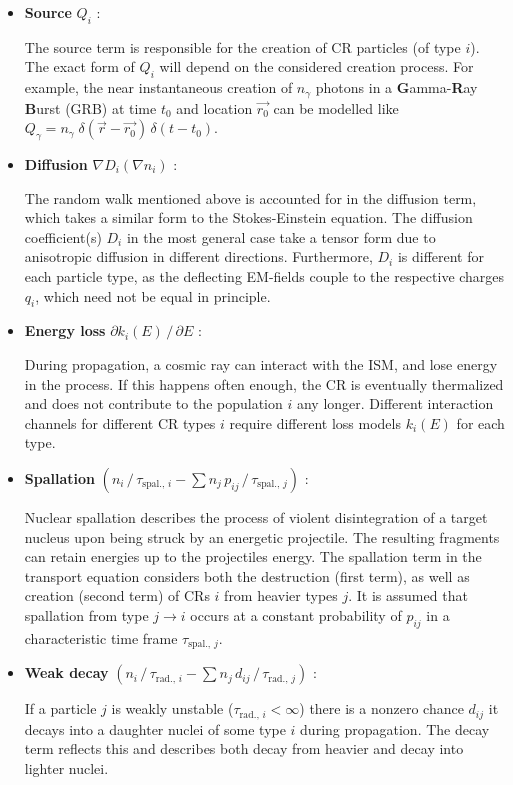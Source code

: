 \begin{itemize}
	\item \textbf{Source} $Q_i$ :

	The source term is responsible for the creation of CR particles (of type $i$). The exact form of $Q_i$ will depend on the considered creation process. For 
	example, the near instantaneous creation of $n_\gamma$ photons in a \textbf{G}amma-\textbf{R}ay \textbf{B}urst (GRB) at time $t_0$ and location $\vec{r_0}$ can 
	be modelled like $Q_\gamma = n_\gamma \; \delta(\vec{r} - \vec{r_0}) \, \delta(t - t_0)$.

	\item \textbf{Diffusion} $\nabla D_i \left( \nabla n_i \right)$ :

	The random walk mentioned above is accounted for in the diffusion term, which takes a similar form to the Stokes-Einstein equation. The diffusion 
	coefficient(s) $D_i$ in the most general case take a tensor form due to anisotropic diffusion in different directions. Furthermore, $D_i$ is 
	different for each particle type, as the deflecting EM-fields couple to the respective charges $q_i$, which need not be equal in principle.

	\item \textbf{Energy loss} $\partial k_i(E)\,/\,\partial E$ :

	During propagation, a cosmic ray can interact with the ISM, and lose energy in the process. If this happens often enough, the CR is eventually thermalized and 
	does not contribute to the population $i$ any longer. Different interaction channels for different CR types $i$ require different loss models $k_i(E)$ for each 
	type. 

	\item \textbf{Spallation} $\left( n_i\,/\,\tau_{\text{spal.},\,i} - \sum n_j\,p_{ij}\,/\,\tau_{\text{spal.},\,j} \right)$ :

	Nuclear spallation describes the process of violent disintegration of a target nucleus upon being struck by an energetic projectile. The resulting fragments
	can retain energies up to the projectiles energy. The spallation term in the transport equation considers both the destruction (first term), as well as 
	creation (second term) of CRs $i$ from heavier types $j$. It is assumed that spallation from type $j \rightarrow i$ occurs at a constant probability of 
	$p_{ij}$ in a characteristic time frame $\tau_{\text{spal.},\,j}$.

	\item \textbf{Weak decay} $\left( n_i\,/\,\tau_{\text{rad.},\,i} - \sum n_j\,d_{ij}\,/\,\tau_{\text{rad.},\,j} \right)$ :

	If a particle $j$ is weakly unstable ($\tau_{\text{rad.},\,i} < \infty$) there is a nonzero chance $d_{ij}$ it decays into a daughter nuclei of some type $i$ 
	during propagation. The decay term reflects this and describes both decay from heavier and decay into lighter nuclei.
\end{itemize}

